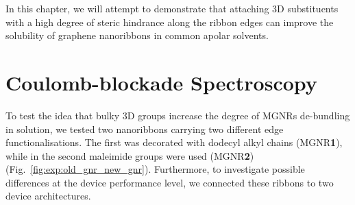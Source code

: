 In this chapter, we will attempt to demonstrate that attaching 3D substituents with a high degree of steric hindrance along the ribbon edges can improve the solubility of graphene nanoribbons in common apolar solvents.

\section{Coulomb-blockade Spectroscopy}\label{solubility:sec:transport}

To test the idea that bulky 3D groups increase the degree of \glspl{MGNR} de-bundling in solution, we tested two nanoribbons carrying two different edge functionalisations. The first was decorated with dodecyl alkyl chains (\gls{MGNR}\textbf{1}), while in the second  maleimide  groups were used (\gls{MGNR}\textbf{2}) (Fig.~\ref{fig:exp:old_gnr_new_gnr}). Furthermore, to investigate possible differences at the device performance level, we connected these ribbons to two device architectures.

